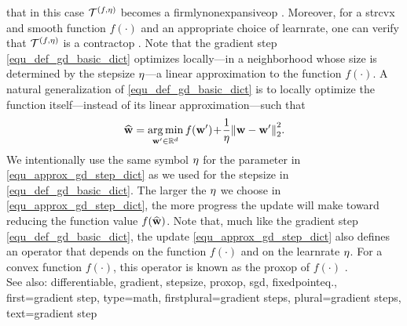 {{		that in this case $\mathcal{T}^{(f,\eta)}$ becomes a \gls{firmlynonexpansiveop} 
		\cite[Corollary 18.16]{BausckeCombette}. Moreover, for 
		a \gls{strcvx} and \gls{smooth} \gls{function} $f(\cdot)$ and an 
		appropriate choice of \gls{learnrate}, one can verify that 
		$\mathcal{T}^{(f,\eta)}$ is a \gls{contractop} \cite[Th. 2.1.14]{nesterov04}.
		Note that the \gls{gradient} step \eqref{equ_def_gd_basic_dict} optimizes 
		locally—in a \gls{neighborhood} whose size is determined by the \gls{stepsize} 
		$\eta$—a linear approximation to the \gls{function} $f(\cdot)$. 
		A natural \gls{generalization} of \eqref{equ_def_gd_basic_dict} is to locally 
		optimize the \gls{function} itself—instead of its linear approximation—such that
		\begin{align} 
			\label{equ_approx_gd_step_dict}
			\widehat{\weights} = \argmin_{\weights' \in \mathbb{R}^{\dimlocalmodel}} f(\weights')\!+\!\frac{1}{\lrate}\normgeneric{\weights-\weights'}{2}^2. 
		\end{align}
		We intentionally use the same symbol $\eta$ for the \gls{parameter} in \eqref{equ_approx_gd_step_dict} 
		as we used for the \gls{stepsize} in \eqref{equ_def_gd_basic_dict}. The larger the $\eta$ we choose in 
		\eqref{equ_approx_gd_step_dict}, the more progress the update will make toward reducing the 
		\gls{function} value $f(\widehat{{\bf w}})$. Note that, much like the \gls{gradient} 
		step \eqref{equ_def_gd_basic_dict}, the update \eqref{equ_approx_gd_step_dict} also 
		defines an \gls{operator} that depends on the \gls{function} $f(\cdot)$ and on
		the \gls{learnrate} $\eta$. For a \gls{convex} \gls{function} $f(\cdot)$, 
		this \gls{operator} is known as the \gls{proxop} of $f(\cdot)$ \cite{ProximalMethods}. 
					\\ 
		See also: \gls{differentiable}, \gls{gradient}, \gls{stepsize}, \gls{proxop}, \gls{sgd}, \gls{fixedpointeq}.},
	first={gradient step},
	type=math,
	firstplural={gradient steps},
	plural={gradient steps},
	text={gradient step}
}

